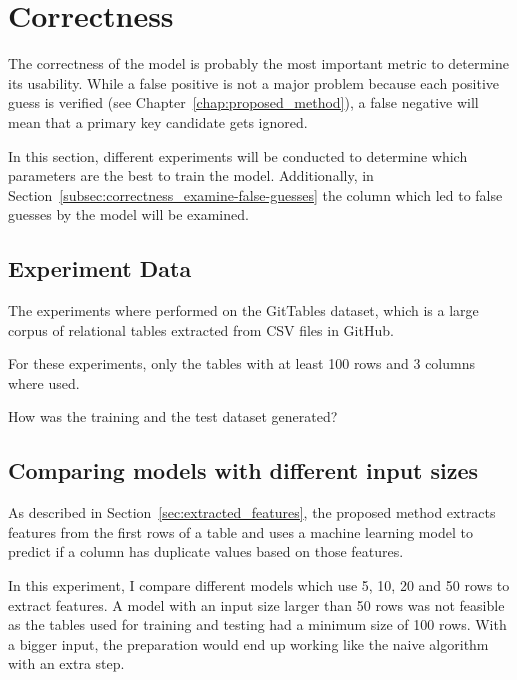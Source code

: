 \section{Correctness}\label{sec:correctness}
The correctness of the model is probably the most important metric to determine its usability. While a false positive is not a major problem because each positive guess is verified (see Chapter~\ref{chap:proposed_method}), a false negative will mean that a primary key candidate gets ignored.

In this section, different experiments will be conducted to determine which parameters are the best to train the model. Additionally, in Section~\ref{subsec:correctness_examine-false-guesses} the column which led to false guesses by the model will be examined.


\subsection{Experiment Data}\label{subsec:correctness_experiment-data} %
The experiments where performed on the GitTables dataset, which is a large corpus of relational tables extracted from CSV files in GitHub\cite{gittables-article}.

For these experiments, only the tables with at least 100 rows and 3 columns where used. %

How was the training and the test dataset generated? %


\subsection{Comparing models with different input sizes}\label{subsec:correctness_comparing-input-size}
As described in Section~\ref{sec:extracted_features}, the proposed method extracts features from the first rows of a table and uses a machine learning model to predict if a column has duplicate values based on those features. %

In this experiment, I compare different models which use \num{5}, \num{10}, \num{20} and \num{50} rows to extract features. A model with an input size larger than \num{50} rows was not feasible as the tables used for training and testing had a minimum size of \num{100} rows. With a bigger input, the preparation would end up working like the naive algorithm with an extra step.


